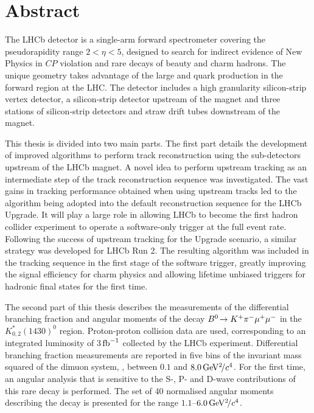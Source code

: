 \section*{Abstract}

The LHCb detector is a single-arm forward spectrometer covering the pseudorapidity range $2 < \eta < 5$, designed to search for indirect evidence of New Physics in $C\!P$ violation and rare decays of beauty and charm hadrons. The unique geometry takes advantage of the large \bquark and \cquark quark production in the forward region at the LHC. The detector includes a high granularity silicon-strip vertex detector, a silicon-strip detector upstream of the magnet and three stations of silicon-strip detectors and straw drift tubes downstream of the magnet.

This thesis is divided into two main parts. The first part details the development of improved algorithms to perform track reconstruction using the sub-detectors upstream of the LHCb magnet. A novel idea to perform upstream tracking as an intermediate step of the track reconstruction sequence was investigated. The vast gains in tracking performance obtained when using upstream tracks led to the algorithm being adopted into the default reconstruction sequence for the LHCb Upgrade. It will play a large role in allowing LHCb to become the first hadron collider experiment to operate a software-only trigger at the full event rate. Following the success of upstream tracking for the Upgrade scenario, a similar strategy was developed for LHCb Run 2. The resulting algorithm was included in the tracking sequence in the first stage of the software trigger, greatly improving the signal efficiency for charm physics and allowing lifetime unbiased triggers for hadronic final states for the first time.

The second part of this thesis describes the measurements of the differential branching fraction and angular moments of the decay ${B}^0\!\rightarrow K^{+}\pi^{-}\mu^{+}\mu^{-}$ in the $K^{*}_{0,2}(1430)^{0}$ region. Proton-proton collision data are used, corresponding to an integrated luminosity of 3$\mbox{\,fb}^{-1}$ collected by the LHCb experiment. Differential branching fraction measurements are reported in five bins of the invariant mass squared of the dimuon system, \qsq, between $0.1$ and $8.0{\mathrm{\,Ge\kern -0.1em V^2\!/}c^4}$. For the first time, an angular analysis that is sensitive to the S-, P- and D-wave contributions of this rare decay is performed. The set of 40 normalised angular moments describing the decay is presented for the \qsq range $1.1$--$6.0{\mathrm{\,Ge\kern -0.1em V^2\!/}c^4}$. 